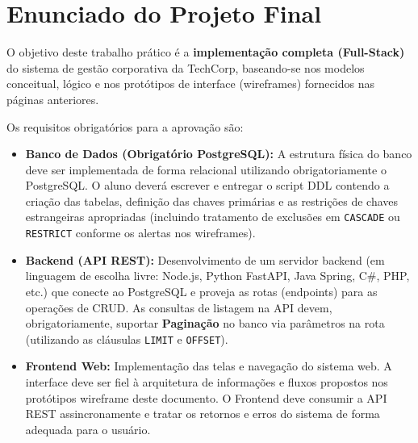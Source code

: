 \documentclass[12pt,a4paper]{article}
\begin{document}
\vspace{0.4cm}
\section*{Enunciado do Projeto Final}

O objetivo deste trabalho prático é a \textbf{implementação completa (Full-Stack)} do sistema de gestão corporativa da TechCorp, baseando-se nos modelos conceitual, lógico e nos protótipos de interface (wireframes) fornecidos nas páginas anteriores. 

Os requisitos obrigatórios para a aprovação são:
\begin{itemize}[leftmargin=*, noitemsep]
    \item \textbf{Banco de Dados (Obrigatório PostgreSQL):} A estrutura física do banco deve ser implementada de forma relacional utilizando obrigatoriamente o PostgreSQL. O aluno deverá escrever e entregar o script DDL contendo a criação das tabelas, definição das chaves primárias e as restrições de chaves estrangeiras apropriadas (incluindo tratamento de exclusões em \texttt{CASCADE} ou \texttt{RESTRICT} conforme os alertas nos wireframes).
    \item \textbf{Backend (API REST):} Desenvolvimento de um servidor backend (em linguagem de escolha livre: Node.js, Python FastAPI, Java Spring, C\#, PHP, etc.) que conecte ao PostgreSQL e proveja as rotas (endpoints) para as operações de CRUD. As consultas de listagem na API devem, obrigatoriamente, suportar \textbf{Paginação} no banco via parâmetros na rota (utilizando as cláusulas \texttt{LIMIT} e \texttt{OFFSET}).
    \item \textbf{Frontend Web:} Implementação das telas e navegação do sistema web. A interface deve ser fiel à arquitetura de informações e fluxos propostos nos protótipos wireframe deste documento. O Frontend deve consumir a API REST assincronamente e tratar os retornos e erros do sistema de forma adequada para o usuário.
\end{itemize}
\end{document}
